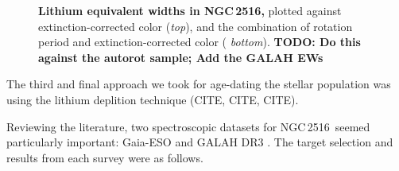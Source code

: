 \documentclass[12pt,twocolumn,tighten]{aastex63}
\newcommand{\cn}{NGC\,2516} %
\begin{document}
\begin{figure}[t]
	\begin{center}
		\leavevmode
	
	\end{center}
	\vspace{-0.7cm}
  \caption{ {\bf Lithium equivalent widths in NGC\,2516,}
  plotted against extinction-corrected color ({\it top}), and the
  combination of rotation period and extinction-corrected color ({\it
  bottom}).
  {\bf TODO: Do this against the autorot sample; Add the GALAH EWs}
  \label{fig:lithium}
  }
\end{figure}

The third and final approach we took for age-dating the stellar
population was using the lithium deplition technique (CITE, CITE,
CITE).

Reviewing the literature, two spectroscopic datasets for \cn\ seemed
particularly important: Gaia-ESO 
\citep{randich_gaiaeso_2018} and GALAH DR3 \citep{buder_galah_2020}.
The target selection and results from each survey were as follows.
\end{document}
